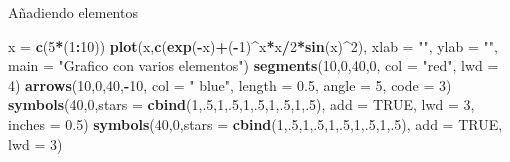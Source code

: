 \documentclass[
  ignorenonframetext,
]{beamer}
\newenvironment{Shaded}{\begin{snugshade}}{\end{snugshade}}
\newcommand{\AttributeTok}[1]{\textcolor[rgb]{0.13,0.29,0.53}{#1}}
\newcommand{\ConstantTok}[1]{\textcolor[rgb]{0.56,0.35,0.01}{#1}}
\newcommand{\DecValTok}[1]{\textcolor[rgb]{0.00,0.00,0.81}{#1}}
\newcommand{\FloatTok}[1]{\textcolor[rgb]{0.00,0.00,0.81}{#1}}
\newcommand{\FunctionTok}[1]{\textcolor[rgb]{0.13,0.29,0.53}{\textbf{#1}}}
\newcommand{\NormalTok}[1]{#1}
\newcommand{\OtherTok}[1]{\textcolor[rgb]{0.56,0.35,0.01}{#1}}
\newcommand{\SpecialCharTok}[1]{\textcolor[rgb]{0.81,0.36,0.00}{\textbf{#1}}}
\newcommand{\StringTok}[1]{\textcolor[rgb]{0.31,0.60,0.02}{#1}}
\begin{document}
\begin{frame}[fragile]{Añadiendo elementos}
\label{auxf1adiendo-elementos}
\begin{Shaded}
\begin{Highlighting}[]
\NormalTok{x }\OtherTok{=} \FunctionTok{c}\NormalTok{(}\DecValTok{5}\SpecialCharTok{*}\NormalTok{(}\DecValTok{1}\SpecialCharTok{:}\DecValTok{10}\NormalTok{))}
\FunctionTok{plot}\NormalTok{(x,}\FunctionTok{c}\NormalTok{(}\FunctionTok{exp}\NormalTok{(}\SpecialCharTok{{-}}\NormalTok{x)}\SpecialCharTok{+}\NormalTok{(}\SpecialCharTok{{-}}\DecValTok{1}\NormalTok{)}\SpecialCharTok{\^{}}\NormalTok{x}\SpecialCharTok{*}\NormalTok{x}\SpecialCharTok{/}\DecValTok{2}\SpecialCharTok{*}\FunctionTok{sin}\NormalTok{(x)}\SpecialCharTok{\^{}}\DecValTok{2}\NormalTok{), }\AttributeTok{xlab =} \StringTok{""}\NormalTok{, }\AttributeTok{ylab =} \StringTok{""}\NormalTok{, }
     \AttributeTok{main =} \StringTok{"Grafico con varios elementos"}\NormalTok{)}
\FunctionTok{segments}\NormalTok{(}\DecValTok{10}\NormalTok{,}\DecValTok{0}\NormalTok{,}\DecValTok{40}\NormalTok{,}\DecValTok{0}\NormalTok{, }\AttributeTok{col =} \StringTok{"red"}\NormalTok{, }\AttributeTok{lwd =} \DecValTok{4}\NormalTok{)}
\FunctionTok{arrows}\NormalTok{(}\DecValTok{10}\NormalTok{,}\DecValTok{0}\NormalTok{,}\DecValTok{40}\NormalTok{,}\SpecialCharTok{{-}}\DecValTok{10}\NormalTok{, }\AttributeTok{col =} \StringTok{" blue"}\NormalTok{, }\AttributeTok{length =} \FloatTok{0.5}\NormalTok{,}
       \AttributeTok{angle =} \DecValTok{5}\NormalTok{, }\AttributeTok{code =} \DecValTok{3}\NormalTok{)}
\FunctionTok{symbols}\NormalTok{(}\DecValTok{40}\NormalTok{,}\DecValTok{0}\NormalTok{,}\AttributeTok{stars =} \FunctionTok{cbind}\NormalTok{(}\DecValTok{1}\NormalTok{,.}\DecValTok{5}\NormalTok{,}\DecValTok{1}\NormalTok{,.}\DecValTok{5}\NormalTok{,}\DecValTok{1}\NormalTok{,.}\DecValTok{5}\NormalTok{,}\DecValTok{1}\NormalTok{,.}\DecValTok{5}\NormalTok{,}\DecValTok{1}\NormalTok{,.}\DecValTok{5}\NormalTok{), }
        \AttributeTok{add =} \ConstantTok{TRUE}\NormalTok{, }\AttributeTok{lwd =} \DecValTok{3}\NormalTok{, }\AttributeTok{inches =} \FloatTok{0.5}\NormalTok{)}
\FunctionTok{symbols}\NormalTok{(}\DecValTok{40}\NormalTok{,}\DecValTok{0}\NormalTok{,}\AttributeTok{stars =} \FunctionTok{cbind}\NormalTok{(}\DecValTok{1}\NormalTok{,.}\DecValTok{5}\NormalTok{,}\DecValTok{1}\NormalTok{,.}\DecValTok{5}\NormalTok{,}\DecValTok{1}\NormalTok{,.}\DecValTok{5}\NormalTok{,}\DecValTok{1}\NormalTok{,.}\DecValTok{5}\NormalTok{,}\DecValTok{1}\NormalTok{,.}\DecValTok{5}\NormalTok{),}
        \AttributeTok{add =} \ConstantTok{TRUE}\NormalTok{, }\AttributeTok{lwd =} \DecValTok{3}\NormalTok{)}

\end{Highlighting}
\end{Shaded}
\end{frame}
\end{document}
